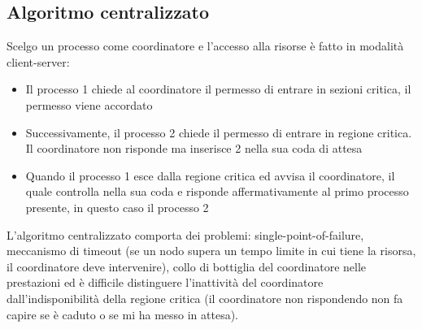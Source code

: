 \documentclass[12pt,italian]{report}
\begin{document}
\subsection{Algoritmo centralizzato} 
Scelgo un processo come coordinatore e l'accesso alla risorse è fatto in modalità client-server:
\begin{itemize}
    \item Il processo 1 chiede al coordinatore il permesso di entrare in sezioni critica, il permesso viene accordato
    \item Successivamente, il processo 2 chiede il permesso di entrare in regione critica. Il coordinatore non risponde ma inserisce 2 nella sua coda di attesa
    \item Quando il processo 1 esce dalla regione critica ed avvisa il coordinatore, il quale controlla nella sua coda e risponde affermativamente al primo processo presente, in questo caso il processo 2
\end{itemize}
L'algoritmo centralizzato comporta dei problemi: single-point-of-failure, meccanismo di timeout (se un nodo supera un tempo limite in cui tiene la risorsa, il coordinatore deve intervenire), collo di bottiglia del coordinatore nelle prestazioni ed è difficile distinguere l'inattività del coordinatore dall'indisponibilità della regione critica (il coordinatore non rispondendo non fa capire se è caduto o se mi ha messo in attesa).
\end{document}
